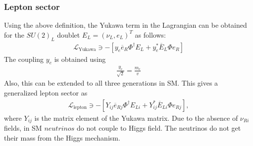 \subsubsection{Lepton sector}
\vspace{-0.3cm}
Using the above definition, the Yukawa term in the Lagrangian can be obtained for the $SU(2)_L$ doublet $E_{L}=\left(\nu_{L}, e_{L}\right)^{T}$ as follows:
\begin{eqnarray}
\mathcal{L}_{\mathrm{Yukawa}} \ni-\left[y_{e} \overline{e}_{R} \Phi^{\dagger} E_{L}+y_{e}^{*} \overline{E}_{L} \Phi e_{R}\right]
\end{eqnarray}
The coupling $y_{e}$ is obtained using
\begin{eqnarray}
\frac{y_{e}}{\sqrt{2}}=\frac{m_{e}}{v}
\end{eqnarray} 	
Also, this can be extended to all three generations in SM. This gives a generalized lepton sector as
\begin{eqnarray}
\mathcal{L}_{\mathrm{lepton}} \ni -\left[Y_{ij} \overline{e}_{Rj} \Phi^{\dagger} E_{Li}+Y_{ij}^{*} \overline{E}_{Li} \Phi e_{Rj}\right],
\end{eqnarray} 
where $Y_{ij}$ is the matrix element of the Yukawa matrix.
Due to the absence of $\nu_{Ri}$ fields, in SM $neutrinos$ do not couple to Higgs field. The neutrinos do not get their mass from the Higgs mechanism.
\vspace{-0.3cm}
